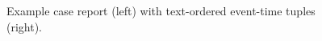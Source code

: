\begin{figure}[htbp]
\begin{ChFiveFloatBody}
{\begin{minipage}[t]{0.49\textwidth}
    \label{ch05:fig:table_box}
  \end{minipage}}

  
  
  

\end{ChFiveFloatBody}
\caption{Example case report (left) with text-ordered event-time tuples (right).
  }
\end{figure}